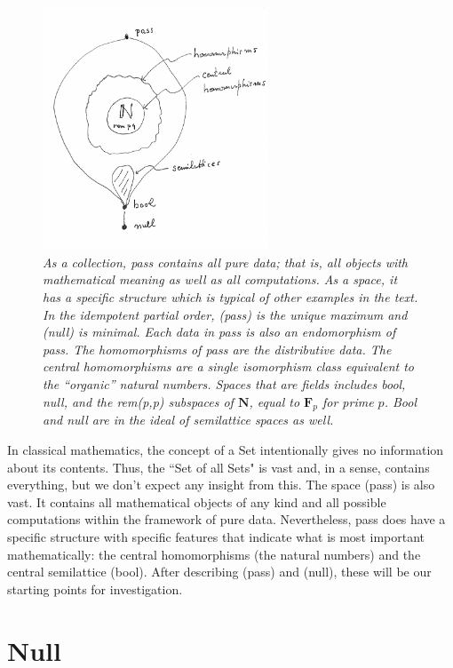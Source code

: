 \documentclass[11pt]{article}
\begin{document}
\begin{figure}[h]
\centering
\includegraphics[width=0.6\textwidth]{pass.pdf}
\caption{{\it As a collection, pass contains all pure data; that is, all objects with mathematical 
meaning as well as all computations.  As a space, it has a specific structure which is typical of other examples in the text.  
In the idempotent partial order, (pass) is the unique maximum and (null) is minimal.  Each data in pass is also an endomorphism of pass.  The homomorphisms of pass are the distributive data.  The central homomorphisms are a single isomorphism class equivalent to the ``organic'' natural 
numbers.  Spaces that are fields includes bool, null, and the rem(p,p) subspaces of ${\mathbf N}$, equal to ${\mathbf F}_p$ for prime $p$.  Bool and null are in the ideal of semilattice spaces as well.}}
\end{figure}

In classical mathematics, the concept of a Set intentionally gives no information about its contents.  Thus, the ``Set of all Sets" is vast and, in 
a sense, contains everything, but we don't expect any insight from this.  The space (pass) is also vast.  It contains all mathematical objects 
of any kind and all possible computations within the framework of pure data.  Nevertheless, pass does have a specific structure with specific 
features that indicate what is most important mathematically: the central homomorphisms (the natural numbers) and the central semilattice (bool).  
After describing (pass) and (null), these will be our starting points for investigation.  

\section{Null}
\end{document}
